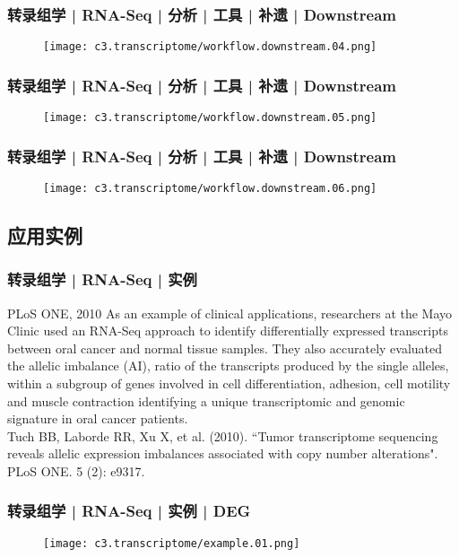 \begin{frame}
  \frametitle{转录组学 | RNA-Seq | 分析 | 工具 | 补遗 | Downstream}
  \begin{figure}
    \centering
    \texttt{[image: c3.transcriptome/workflow.downstream.04.png]}
  \end{figure}
\end{frame}

\begin{frame}
  \frametitle{转录组学 | RNA-Seq | 分析 | 工具 | 补遗 | Downstream}
  \begin{figure}
    \centering
    \texttt{[image: c3.transcriptome/workflow.downstream.05.png]}
  \end{figure}
\end{frame}

\begin{frame}
  \frametitle{转录组学 | RNA-Seq | 分析 | 工具 | 补遗 | Downstream}
  \begin{figure}
    \centering
    \texttt{[image: c3.transcriptome/workflow.downstream.06.png]}
  \end{figure}
\end{frame}

\subsection{应用实例}
\begin{frame}
  \frametitle{转录组学 | RNA-Seq | 实例}
  \begin{block}{PLoS ONE, 2010}
  As an example of clinical applications, researchers at the Mayo Clinic used an RNA-Seq approach to identify differentially expressed transcripts between oral cancer and normal tissue samples. They also accurately evaluated the allelic imbalance (AI), ratio of the transcripts produced by the single alleles, within a subgroup of genes involved in cell differentiation, adhesion, cell motility and muscle contraction identifying a unique transcriptomic and genomic signature in oral cancer patients.\\
  \vspace{0.5em}
 Tuch BB, Laborde RR, Xu X, et al. (2010). ``Tumor transcriptome sequencing reveals allelic expression imbalances associated with copy number alterations". PLoS ONE. 5 (2): e9317. 
  \end{block}
\end{frame}

\begin{frame}
  \frametitle{转录组学 | RNA-Seq | 实例 | DEG}
  \begin{figure}
    \centering
    \texttt{[image: c3.transcriptome/example.01.png]}
  \end{figure}
\end{frame}

